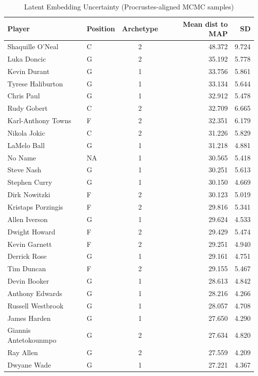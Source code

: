 \begin{table}[t]
\caption*{
{\fontsize{20}{25}\selectfont  Latent Embedding Uncertainty (Procrustes-aligned MCMC samples)\fontsize{12}{15}\selectfont }
} 
\fontsize{12.0pt}{14.0pt}\selectfont
\begin{tabular*}{\linewidth}{@{\extracolsep{\fill}}llcrr}
\toprule
Player & Position & Archetype & Mean dist to MAP & SD \\ 
\midrule\addlinespace[2.5pt]
Shaquille O'Neal & C & 2 & 48.372 & 9.724 \\ 
Luka Doncic & G & 2 & 35.192 & 5.778 \\ 
Kevin Durant & G & 1 & 33.756 & 5.861 \\ 
Tyrese Haliburton & G & 1 & 33.134 & 5.644 \\ 
Chris Paul & G & 1 & 32.912 & 5.478 \\ 
Rudy Gobert & C & 2 & 32.709 & 6.665 \\ 
Karl-Anthony Towns & F & 2 & 32.351 & 6.179 \\ 
Nikola Jokic & C & 2 & 31.226 & 5.829 \\ 
LaMelo Ball & G & 1 & 31.218 & 4.881 \\ 
No Name & NA & 1 & 30.565 & 5.418 \\ 
Steve Nash & G & 1 & 30.251 & 5.613 \\ 
Stephen Curry & G & 1 & 30.150 & 4.669 \\ 
Dirk Nowitzki & F & 2 & 30.123 & 5.019 \\ 
Kristaps Porzingis & F & 2 & 29.816 & 5.341 \\ 
Allen Iverson & G & 1 & 29.624 & 4.533 \\ 
Dwight Howard & F & 2 & 29.429 & 5.474 \\ 
Kevin Garnett & F & 2 & 29.251 & 4.940 \\ 
Derrick Rose & G & 1 & 29.161 & 4.751 \\ 
Tim Duncan & F & 2 & 29.155 & 5.467 \\ 
Devin Booker & G & 1 & 28.613 & 4.842 \\ 
Anthony Edwards & G & 1 & 28.216 & 4.266 \\ 
Russell Westbrook & G & 1 & 28.057 & 4.708 \\ 
James Harden & G & 1 & 27.650 & 4.290 \\ 
Giannis Antetokounmpo & G & 2 & 27.634 & 4.820 \\ 
Ray Allen & G & 2 & 27.559 & 4.209 \\ 
Dwyane Wade & G & 1 & 27.221 & 4.367 \\ 

\end{tabular*}
\end{table}
